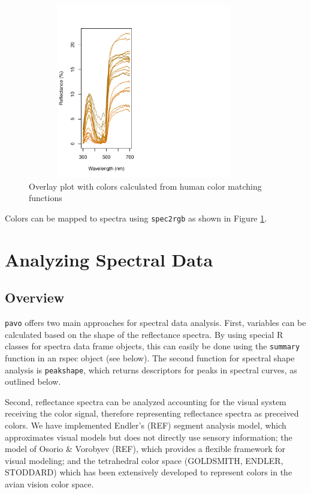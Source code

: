 \documentclass{article}
\newcommand{\pavo}{{\tt pavo}}  %
\newcommand{\code}[1]{{\tt #1}}  %
\begin{document}
\begin{figure} %
\begin{center}
\includegraphics[width=4in, height=3in]{pavo-overlay}
\end{center}
\caption{Overlay plot with colors calculated from human color matching functions}
\label{figure:overlay}
\end{figure}

Colors can be mapped to spectra using \code{spec2rgb} as shown in 
Figure \ref{figure:overlay}.


\section{Analyzing Spectral Data}

\subsection{Overview}

\pavo{} offers two main approaches for spectral data analysis. First, variables can be 
calculated based on the shape of the reflectance spectra. By using special R classes for spectra 
data frame objects, this can easily be done using the \code{summary} function in an rspec 
object (see below). The second function for spectral shape analysis is \code{peakshape}, which returns descriptors for peaks in spectral curves, as outlined below.

Second, reflectance spectra can be analyzed accounting for the visual system receiving the color 
signal, therefore representing reflectance spectra as preceived colors. We have implemented 
Endler's (REF) segment analysis model, which approximates visual models but does not directly 
use sensory information; the model of Osorio \& Vorobyev (REF), which provides a flexible 
framework for visual modeling; and the tetrahedral color space (GOLDSMITH, ENDLER, STODDARD) 
which has been extensively developed to represent colors in the avian vision color space.
\end{document}
